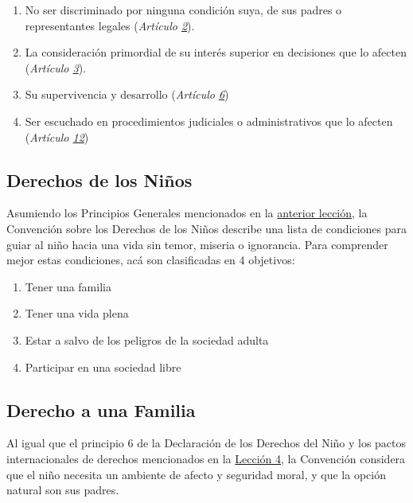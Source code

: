 \documentclass{tufte-handout}
\begin{document}
\begin{enumerate}
\item{No ser discriminado por ninguna condición suya, de sus padres o representantes legales (\textit{Artículo \href{https://procosi.github.io/nenes/convencion/?a=2}{2}}).}
\item{La consideración primordial de su interés superior en decisiones que lo afecten (\textit{Artículo \href{https://procosi.github.io/nenes/convencion/?a=3}{3}}).}
\item{Su supervivencia y desarrollo (\textit{Artículo \href{https://procosi.github.io/nenes/convencion/?a=6}{6}})}
\item{Ser escuchado en procedimientos judiciales o administrativos que lo afecten (\textit{Artículo \href{https://procosi.github.io/nenes/convencion/?a=12}{12}})}
\end{enumerate}

\subsection{Derechos de los Niños}\label{subsec:derechos}

Asumiendo los Principios Generales mencionados en la \hyperref[subsec:conceptos]{anterior lección}, la Convención sobre los Derechos de los Niños describe una lista de condiciones para guiar al niño hacia una vida sin temor, miseria o ignorancia. Para comprender mejor estas condiciones, acá son clasificadas en 4 objetivos:

\begin{enumerate}
\item{Tener una familia}
\item{Tener una vida plena}
\item{Estar a salvo de los peligros de la sociedad adulta}
\item{Participar en una sociedad libre}
\end{enumerate}

\subsection{Derecho a una Familia}\label{subsec:familia}


Al igual que el principio 6 de la Declaración de los Derechos del Niño y los pactos internacionales de derechos mencionados en la \hyperref[subsec:efecto]{Lección 4}, la Convención considera que el niño necesita un ambiente de afecto y seguridad moral, y que la opción natural son sus padres. 
\end{document}
